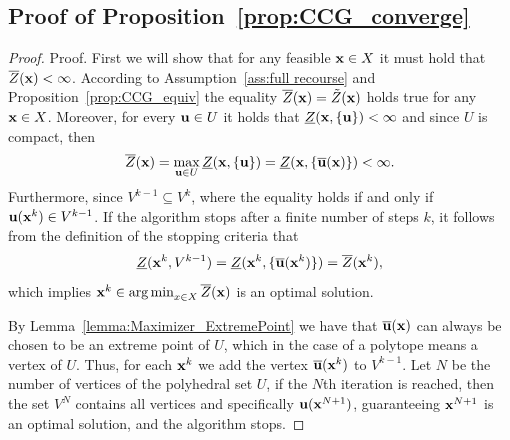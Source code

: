 \documentclass[12pt,x11names]{article}
\theoremstyle{definition}
\newcommand{\bu}{{\bf u}}
\newcommand{\bx}{{\bf x}}
\DeclareMathOperator*{\argmin}{arg\,min}
\begin{document}
\begin{appendix}
\section{Proof of Proposition~\ref{prop:CCG_converge}}\label{appx:convergence proof}
\begin{proof}{Proof.}
First we will show that for any feasible $\bx\in X$ it must hold that $\overline{Z}(\bx)<\infty$. According to Assumption~\ref{ass:full recourse} and Proposition~\ref{prop:CCG_equiv} the equality  $\overline{Z}(\bx)=\tilde{Z}(\bx)$ holds true for any $\bx\in X$. Moreover, for every $\bu\in U$ it holds that $\underline{Z}(\bx,\{\bu\})<\infty$ and since $U$ is compact, then 
$$\overline{Z}(\bx)=\max_{\bu\in U} \underline{Z}(\bx,\{\bu\})=\underline{Z}(\bx,\{\overline{\bu}(\bx)\})<\infty.$$
Furthermore, since $V^{k-1}\subseteq V^k$, where the equality holds if and only if $\bu(\bx^k)\in V^{k-1}$.
If the algorithm stops after a finite number of steps $k$, it follows from the definition of the stopping criteria that
$$\underline{Z}(\bx^k,V^{k-1})=\underline{Z}(\bx^k,\{\overline{\bu}(\bx^k)\})= \overline{Z}(\bx^k),$$
which implies $\bx^k\in\argmin_{x\in X} \overline{Z}(\bx)$ is an optimal solution.

By Lemma~\ref{lemma:Maximizer_ExtremePoint} we have that $\overline{\bu}(
\bx)$ can always be chosen to be an extreme point of $U$, which in the case of a polytope means a vertex of $U$.
Thus, for each $\bx^k$ we add the vertex $\overline{\bu}(\bx^k)$ to $V^{k-1}$. Let $N$ be the number of vertices of the polyhedral set $U$, if the $N$th iteration is reached, then the set $V^N$ contains all vertices and specifically $\bu(\bx^{N+1})$, guaranteeing $\bx^{N+1}$ is an optimal solution, and the algorithm stops. %


\end{proof}
\end{appendix}
\end{document}

